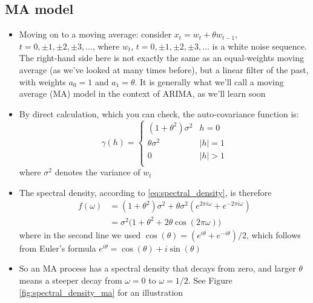 \documentclass{article}
\begin{document}
\subsection{MA model}

\begin{itemize}
\item Moving on to a moving average: consider $x_t = w_t + \theta w_{t-1}$, $t =
  0, \pm 1, \pm 2, \pm 3, \dots$, where $w_t$, $t = 0, \pm 1, \pm 2, \pm 3,
  \dots$ is a white noise sequence. The right-hand side here is not exactly the
  same as an equal-weights moving average (as we've looked at many times
  before), but a linear filter of the past, with weights $a_0 = 1$ and $a_1 =
  \theta$. It is generally what we'll call a moving average (MA) model in the
  context of ARIMA, as we'll learn soon   

\item By direct calculation, which you can check, the auto-covariance function
  is: 
  \[
  \gamma(h) = \begin{cases}
  (1+\theta^2) \sigma^2 & h = 0 \\
  \theta \sigma^2 & |h| = 1 \\
  0 & |h| > 1 \\
  \end{cases}
  \]
  where $\sigma^2$ denotes the variance of $w_t$

\item The spectral density, according to \eqref{eq:spectral_density}, is
  therefore
  \begin{align*}
  f(\omega) &= (1+\theta^2) \sigma^2 + \theta \sigma^2 (e^{2\pi i \omega} +
              e^{-2\pi i \omega}) \\
  &=  \sigma^2 \Big( 1+\theta^2 + 2 \theta \cos(2\pi \omega) \Big)
  \end{align*}
  where in the second line we used $\cos(\theta) = (e^{i\theta} +e^{-i\theta}) / 
  2$, which follows from Euler's formula $e^{i\theta} = \cos(\theta) + i
  \sin(\theta)$

\item So an MA process has a spectral density that decays from zero, and larger
  $\theta$ means a steeper decay from $\omega = 0$ to $\omega = 1/2$. See Figure
  \ref{fig:spectral_density_ma} for an illustration  


\end{itemize}
\end{document}
